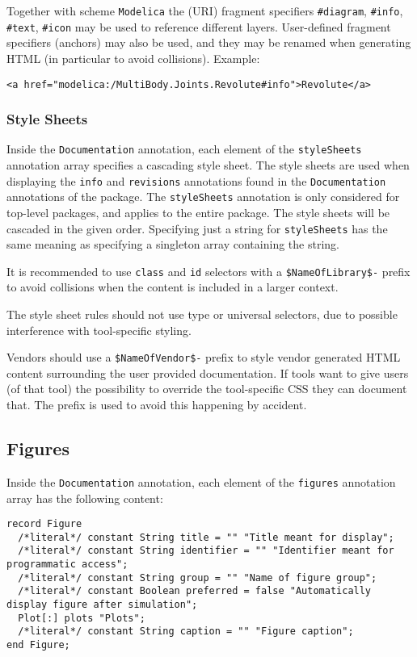 Together with scheme \lstinline!Modelica! the (URI) fragment specifiers \lstinline!#diagram!, \lstinline!#info!, \lstinline!#text!, \lstinline!#icon! may be used to reference different layers.
User-defined fragment specifiers (anchors) may also be used, and they may be renamed when generating HTML (in particular to avoid collisions).
Example:
\begin{lstlisting}[language=modelica]
<a href="modelica:/MultiBody.Joints.Revolute#info">Revolute</a>
\end{lstlisting}

\subsubsection{Style Sheets}\label{style-sheets}

Inside the \lstinline!Documentation! annotation, each element of the \lstinline!styleSheets! annotation array specifies a cascading style sheet.
The style sheets are used when displaying the \lstinline!info! and \lstinline!revisions! annotations found in the \lstinline!Documentation! annotations of the package.
The \lstinline!styleSheets! annotation is only considered for top-level packages, and applies to the entire package.
The style sheets will be cascaded in the given order.
Specifying just a string for \lstinline!styleSheets! has the same meaning as specifying a singleton array containing the string.
\begin{nonnormative}
It is recommended to use \lstinline[language=CSS]!class! and \lstinline[language=CSS]!id! selectors with a \lstinline[language=CSS]!$NameOfLibrary$-! prefix to avoid collisions when the content is included in a larger context.
\end{nonnormative}
The style sheet rules should not use type or universal selectors, due to possible interference with tool-specific styling.

Vendors should use a \lstinline[language=CSS]!$NameOfVendor$-! prefix to style vendor generated HTML content surrounding the user provided documentation.
If tools want to give users (of that tool) the possibility to override the tool-specific CSS they can document that.
The prefix is used to avoid this happening by accident.

\subsection{Figures}\label{annotations-for-figures}\label{figures}

Inside the \lstinline!Documentation! annotation, each element of the \lstinline!figures! annotation array has the following content:
\begin{lstlisting}[language=modelica]
record Figure
  /*literal*/ constant String title = "" "Title meant for display";
  /*literal*/ constant String identifier = "" "Identifier meant for programmatic access";
  /*literal*/ constant String group = "" "Name of figure group";
  /*literal*/ constant Boolean preferred = false "Automatically display figure after simulation";
  Plot[:] plots "Plots";
  /*literal*/ constant String caption = "" "Figure caption";
end Figure;
\end{lstlisting}

